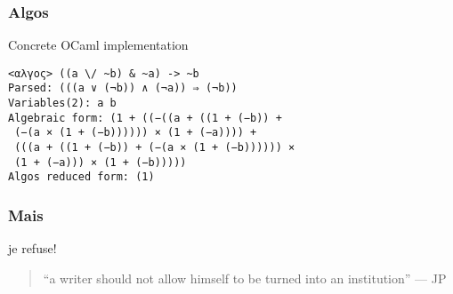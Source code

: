 \documentclass{beamer}
\begin{document}
\begin{frame}[fragile]
\frametitle{Algos}
\begin{block}
{Concrete OCaml implementation}


\begin{center}
\begin{verbatim}
<αλγος> ((a \/ ~b) & ~a) -> ~b
Parsed: (((a ∨ (¬b)) ∧ (¬a)) ⇒ (¬b))
Variables(2): a b
Algebraic form: (1 + ((−((a + ((1 + (−b)) +
 (−(a × (1 + (−b)))))) × (1 + (−a)))) +
 (((a + ((1 + (−b)) + (−(a × (1 + (−b)))))) ×
 (1 + (−a))) × (1 + (−b)))))
Algos reduced form: (1)
\end{verbatim}
\end{center}


\end{block}
\end{frame}



\begin{frame}
\frametitle{Mais}
\begin{block}
{je refuse!} 


\begin{quote}
``a writer should not allow himself to be turned into an institution'' --- \textsc{JP}
\end{quote}


\end{block}
\end{frame}

%
%
\end{document}
